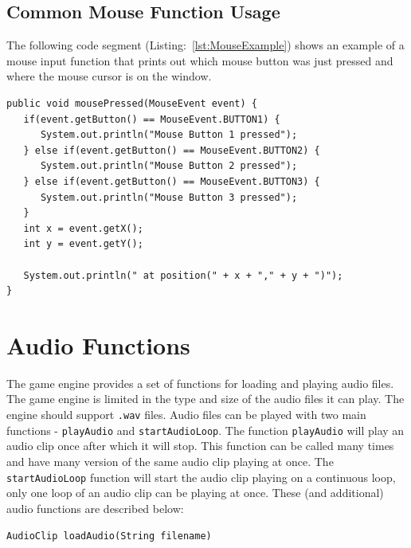 \documentclass[a4paper, 10pt]{report}
\begin{document}
\subsection*{Common Mouse Function Usage} \nonumber

The following code segment (Listing:~\ref{lst:MouseExample}) shows an example of a mouse input function that prints out which mouse button was just pressed and where the mouse cursor is on the window.

\vspace{1em}
\begin{lstlisting}[caption=Example use of the mousePressed function and the MouseEvent., label=lst:MouseExample]
public void mousePressed(MouseEvent event) {
   if(event.getButton() == MouseEvent.BUTTON1) {
      System.out.println("Mouse Button 1 pressed");
   } else if(event.getButton() == MouseEvent.BUTTON2) {
      System.out.println("Mouse Button 2 pressed");
   } else if(event.getButton() == MouseEvent.BUTTON3) {
      System.out.println("Mouse Button 3 pressed");
   }
   int x = event.getX();
   int y = event.getY();
   
   System.out.println(" at position(" + x + "," + y + ")");
}
\end{lstlisting}
\vspace{1em}

\section{Audio Functions}

The game engine provides a set of functions for loading and playing audio files. The game engine is limited in the type and size of the audio files it can play. The engine should support {\tt .wav} files. Audio files can be played with two main functions - {\tt playAudio} and {\tt startAudioLoop}. The function {\tt playAudio} will play an audio clip once after which it will stop. This function can be called many times and have many version of the same audio clip playing at once. The {\tt startAudioLoop} function will start the audio clip playing on a continuous loop, only one loop of an audio clip can be playing at once. These (and additional) audio functions are described below:

\hrulefill

{\large {\tt AudioClip loadAudio(String filename)}}
\end{document}
